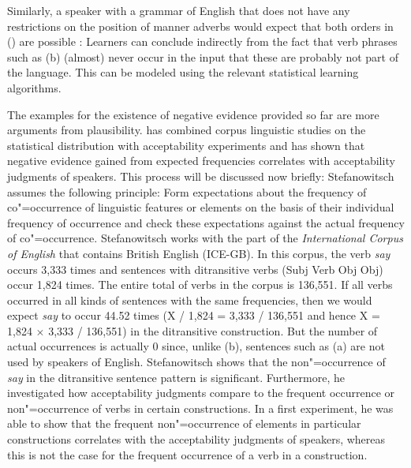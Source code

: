 Similarly, a speaker with a grammar of English that does not have any restrictions on
the position of manner adverbs would expect that both orders in () are possible \citep[]{SP2002b}:
\eal
{}
\zl
Learners can conclude indirectly from the fact that verb phrases such as (b) (almost) never occur in the input that these are probably not part
of the language. This can be modeled using the relevant statistical learning algorithms.

The examples for the existence of negative evidence provided so far are more arguments from plausibility.
\citet{Stefanowitsch2008a} has combined corpus linguistic studies
on the statistical distribution with acceptability experiments and has shown that negative evidence gained from
expected frequencies correlates with acceptability judgments of speakers. This process will be discussed now briefly: Stefanowitsch
assumes the following principle:
\ea
Form expectations about the frequency of co"=occurrence of linguistic features or elements on the basis of their individual frequency of occurrence
and check these expectations against the actual frequency of co"=occurrence. \citep[]{Stefanowitsch2008a}
\z
\addlines
Stefanowitsch works with the part of the \emph{International Corpus of English} that contains British English (ICE-GB). In this corpus, the
verb \emph{say} occurs 3,333 times and sentences with ditransitive verbs (Subj Verb Obj Obj) occur 1,824 times. The entire total of verbs in the corpus
is 136,551. If all verbs occurred in all kinds of sentences with the same frequencies, then we would expect \emph{say} to occur 44.52 times
(X / 1,824 = 3,333 / 136,551 and hence X = 1,824 $\times$ 3,333 / 136,551) in the ditransitive construction. But the number of actual
occurrences is actually 0 since, unlike (b), sentences such as (a) are not used by
speakers of English. 
\eal
{}
\zl
Stefanowitsch shows that the non"=occurrence of \emph{say} in the ditransitive sentence pattern is significant. Furthermore, he investigated how acceptability
judgments compare to the frequent occurrence or non"=occurrence of verbs in certain constructions. 
In a first experiment, he was able to show that the frequent non"=occurrence of elements in particular constructions correlates with the acceptability judgments of speakers, whereas
this is not the case for the frequent occurrence of a verb in a construction.

